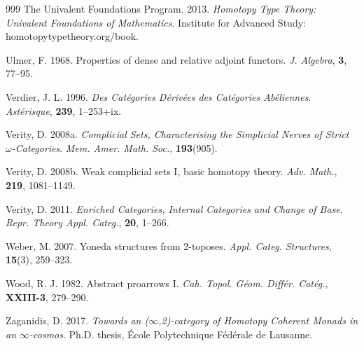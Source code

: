 \begin{thebibliography}{999}
 The Univalent Foundations Program. 2013. \emph{Homotopy Type
  Theory: Univalent Foundations of Mathematics}. Institute for Advanced Study:
  homotopytypetheory.org/book.

 Ulmer, F. 1968. Properties of dense and relative adjoint
  functors. \emph{J. Algebra}, \textbf{3}, 77--95.

 Verdier, J. L. 1996. \emph{Des Catégories Dérivées des
  Catégories Abéliennes}. \emph{Astérisque}, \textbf{239}, 1--253+ix.

 Verity, D. 2008a. \emph{Complicial Sets, Characterising the
  Simplicial Nerves of Strict $\omega$-Categories}. \emph{Mem. Amer. Math.
  Soc.}, \textbf{193}(905).

 Verity, D. 2008b. Weak complicial sets I, basic homotopy
  theory. \emph{Adv. Math.}, \textbf{219}, 1081--1149.

 Verity, D. 2011. \emph{Enriched Categories, Internal Categories
  and Change of Base}. \emph{Repr. Theory Appl. Categ.}, \textbf{20}, 1--266.

 Weber, M. 2007. Yoneda structures from 2-toposes. \emph{Appl.
  Categ. Structures}, \textbf{15}(3), 259--323.

 Wood, R. J. 1982. Abstract proarrows I. \emph{Cah. Topol.
  Géom. Différ. Catég.}, \textbf{XXIII-3}, 279--290.

 Zaganidis, D. 2017. \emph{Towards an ($\infty$,2)-category of
  Homotopy Coherent Monads in an $\infty$-cosmos}. Ph.D. thesis, École
  Polytechnique Fédérale de Lausanne.

\end{thebibliography}
